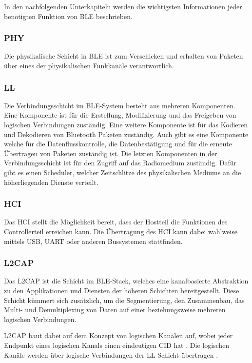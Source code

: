 In den nachfolgenden Unterkapiteln werden die wichtigsten Informationen jeder benötigten Funktion von \ac{BLE} beschrieben.

\subsubsection{\acf{PHY}}
Die physikalische Schicht in \ac{BLE} ist zum Verschicken und erhalten von Paketen über eines der physikalischen Funkkanäle verantwortlich. \cite[S.~209]{bluetoothCore}

\subsubsection{\acf{LL}}
Die Verbindungsschicht im \ac{BLE}-System besteht aus mehreren Komponenten. Eine Komponente ist für die Erstellung, Modifizierung und das Freigeben von logischen Verbindungen zuständig. Eine weitere Komponente ist für das Kodieren und Dekodieren von Bluetooth Paketen zuständig. Auch gibt es eine Komponente welche für die Datenflusskontrolle, die Datenbestätigung und für die erneute Übertragen von Paketen zuständig ist. Die letzten Komponenten in der Verbindungsschicht ist für den Zugriff auf das Radiomedium zuständig. Dafür gibt es einen Scheduler, welcher Zeitschlitze des physikalischen Mediums an die höherliegenden Dienste verteilt. \cite[S.~207f.]{bluetoothCore}

\subsubsection{\acf{HCI}}
Das \acl{HCI} stellt die Möglichkeit bereit, dass der Hostteil die Funktionen des Controllerteil erreichen kann. Die Übertragung des \ac{HCI} kann dabei wahlweise mittels USB, UART oder anderen Bussystemen stattfinden. \cite[S.~1735f.]{bluetoothCore}

\subsubsection{\acf{L2CAP}}
Das \acl{L2CAP} ist die Schicht im \ac{BLE}-Stack, welches eine kanalbasierte Abstraktion zu den Applikationen und Diensten der höheren Schichten bereitgestellt. Diese Schicht kümmert sich zusätzlich, um die Segmentierung, den Zusammenbau, das Multi- und Demultiplexing von Daten auf einer beziehungsweise mehreren logischen Verbindungen. \cite[S.~195, S.~1013]{bluetoothCore}

\acl{L2CAP} baut dabei auf dem Konzept von logischen Kanälen auf, wobei jeder Endpunkt eines logischen Kanals einen eindeutigen \ac{CID} hat \cite[S.~1021]{bluetoothCore}. Die logischen Kanäle werden über logische Verbindungen der \ac{LL}-Schicht übertragen \cite[S.~1013]{bluetoothCore}.

